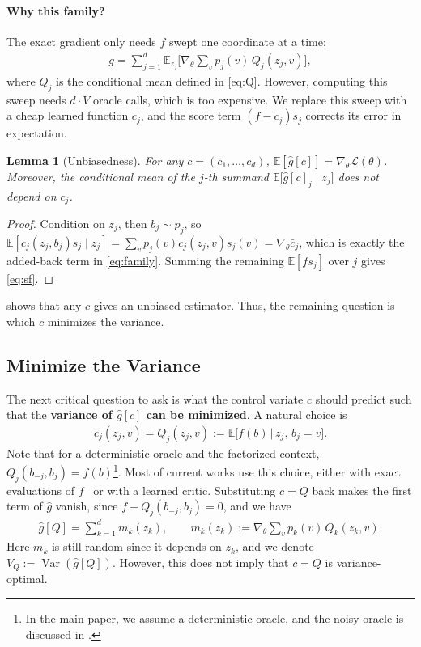 \documentclass[10pt]{article}
\providecommand{\E}{\mathbb{E}}
\providecommand{\gL}{\mathcal{L}}
\providecommand{\Var}{\operatorname{Var}}
\theoremstyle{plain}
\newtheorem{lemma}[theorem]{Lemma}
\theoremstyle{definition}
\theoremstyle{remark}
\theoremstyle{definition}
\newcommand{\ctx}[1]{z_{#1}}                 %
\newcommand{\score}[1]{s_{#1}}               %
\newcommand{\ghat}[1]{\hat g[#1]}            %
\newcommand{\gtrue}{g}                       %
\newcommand{\VQ}{V_{Q}}
\newcommand{\pj}[1]{p_{#1}}                  %
\begin{document}
\paragraph{Why this family?}
The exact gradient only needs $f$ swept one coordinate at a time:
\begin{align}\label{eq:truegrad}
    \gtrue=\sum_{j=1}^{d}\E_{\ctx{j}}\Big[\nabla_\theta\sum_v\pj{j}(v)\,Q_j(\ctx{j},v)\Big],
\end{align}
where $Q_j$ is the conditional mean defined in \eqref{eq:Q}. However, computing this sweep needs $d\cdot V$ oracle calls, which is too expensive. We replace this sweep with a cheap learned function $c_j$, and the score term $(f-c_j)\score{j}$ corrects its error in expectation.

\begin{lemma}[Unbiasedness]\label{lem:unbiased}
    For any $c = (c_1, \dots, c_d)$, $\E[\ghat{c}] = \nabla_\theta \gL(\theta)$. Moreover, the conditional mean of the $j$-th summand $\E\big[\ghat{c}_j\mid\ctx{j}\big]$ does not depend on $c_j$.
\end{lemma}
\begin{proof}
    Condition on $\ctx{j}$, then $b_j\sim\pj{j}$, so $\E[c_j(\ctx{j},b_j)\score{j}\mid\ctx{j}]=\sum_v\pj{j}(v)c_j(\ctx{j},v)\score{j}(v)=\nabla_\theta\bar c_j$, which is exactly the added-back term in \eqref{eq:family}. Summing the remaining $\E[f\score{j}]$ over $j$ gives \eqref{eq:sf}.
\end{proof}

 shows that any $c$ gives an unbiased estimator. Thus, the remaining question is which $c$ minimizes the variance.

\subsection{Minimize the Variance}\label{sec:variance}

The next critical question to ask is what the control variate $c$ should predict such that the \textbf{variance of $\ghat{c}$ can be minimized}. A natural choice is
\begin{align}\label{eq:Q}
    c_j(\ctx{j},v)=Q_j(\ctx{j},v):=\E\big[f(b)\,\big|\,\ctx{j},\,b_j=v\big].
\end{align}
Note that for a deterministic oracle and the factorized context, $Q_j(b_{-j},b_j)=f(b)$\footnote{In the main paper, we assume a deterministic oracle, and the noisy oracle is discussed in .}. Most of current works use this choice, either with exact evaluations of $f$~\cite{titsias2015,tokui2017,SSM23} or with a learned critic. Substituting $c=Q$ back makes the first term of $\hat g$ vanish, since $f-Q_j(b_{-j},b_j)=0$, and we have
\begin{align}\label{eq:mk}
    \ghat{Q}=\sum_{k=1}^{d}m_k(\ctx{k}),\qquad m_k(\ctx{k}):=\nabla_\theta\sum_v\pj{k}(v)\,Q_k(\ctx{k},v).
\end{align}
Here $m_k$ is still random since it depends on $\ctx{k}$, and we denote $\VQ:=\Var(\ghat{Q})$. However, this does not imply that $c = Q$ is variance-optimal.
\end{document}
